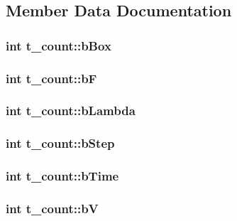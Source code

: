 \subsection{\-Member \-Data \-Documentation}
\hypertarget{structt__count_a416591ce977c4638a95f8879b577e57a}{
\subsubsection[{b\-Box}]{\setlength{\rightskip}{0pt plus 5cm}int {\bf t\-\_\-count\-::b\-Box}}}\label{structt__count_a416591ce977c4638a95f8879b577e57a}
\hypertarget{structt__count_a9dc523f347e45c5955d1bbd24fc4b70d}{
\subsubsection[{b\-F}]{\setlength{\rightskip}{0pt plus 5cm}int {\bf t\-\_\-count\-::b\-F}}}\label{structt__count_a9dc523f347e45c5955d1bbd24fc4b70d}
\hypertarget{structt__count_a905dd72388a78dc7b2487d4cdc41517e}{
\subsubsection[{b\-Lambda}]{\setlength{\rightskip}{0pt plus 5cm}int {\bf t\-\_\-count\-::b\-Lambda}}}\label{structt__count_a905dd72388a78dc7b2487d4cdc41517e}
\hypertarget{structt__count_a74788edaeb72cdb16006f141ac9107e4}{
\subsubsection[{b\-Step}]{\setlength{\rightskip}{0pt plus 5cm}int {\bf t\-\_\-count\-::b\-Step}}}\label{structt__count_a74788edaeb72cdb16006f141ac9107e4}
\hypertarget{structt__count_a62d6b99879bb0dff2b8858bf78451be5}{
\subsubsection[{b\-Time}]{\setlength{\rightskip}{0pt plus 5cm}int {\bf t\-\_\-count\-::b\-Time}}}\label{structt__count_a62d6b99879bb0dff2b8858bf78451be5}
\hypertarget{structt__count_a023cd4d8be115949e03dae8b9fd0c3d0}{
\subsubsection[{b\-V}]{\setlength{\rightskip}{0pt plus 5cm}int {\bf t\-\_\-count\-::b\-V}}}\label{structt__count_a023cd4d8be115949e03dae8b9fd0c3d0}
